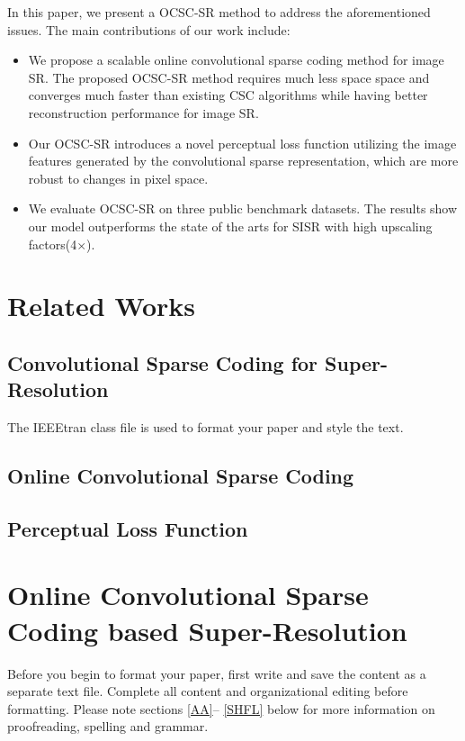\documentclass[conference]{IEEEtran}
\begin{document}
In this paper, we present a OCSC-SR method to address the aforementioned issues. The main contributions of our work include:
\begin{itemize}
\item We propose a scalable online convolutional sparse coding method for image SR. The proposed OCSC-SR method requires much less space space and converges much faster than existing CSC algorithms while having better reconstruction performance for image SR.

\item Our OCSC-SR introduces a novel perceptual loss function utilizing the image features generated by the convolutional sparse representation, which are more robust to changes in pixel space.

\item We evaluate OCSC-SR on three public benchmark datasets. The results show our model outperforms the state of the arts for SISR with high upscaling factors(4$\times$).
\end{itemize}

\section{Related Works}

\subsection{Convolutional Sparse Coding for Super-Resolution}

The IEEEtran class file is used to format your paper and style the text. 
\subsection{Online Convolutional Sparse Coding}
\subsection{Perceptual Loss Function}


\section{Online Convolutional Sparse Coding based Super-Resolution}
Before you begin to format your paper, first write and save the content as a 
separate text file. Complete all content and organizational editing before 
formatting. Please note sections \ref{AA}-- \ref{SHFL} below for more information on 
proofreading, spelling and grammar.
\end{document}
